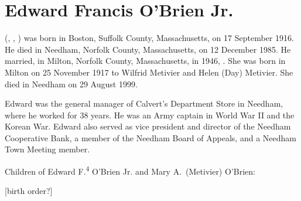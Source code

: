 \section{Edward Francis O'Brien Jr.}

 (, , ) was born in Boston, Suffolk County, Massachusetts, on 17 September 1916.\cite{Edward4OBrien2Birth} He died in Needham, Norfolk County, Massachusetts, on 12 December 1985.\cite{Edward4OBrien2Death,Edward2OBrien2Obit} He married, in Milton, Norfolk County, Massachusetts, in 1946, .\cite{Edward4OBrien2Marriage} She was born in Milton on 25 November 1917 to Wilfrid Metivier and Helen (Day) Metivier.\cite{MaryMetivierBirth} She died in Needham on 29 August 1999.\cite{MaryMetivierDeath}

Edward was the general manager of Calvert's Department Store in Needham, where he worked for 38 years. He was an Army captain in World War II and the Korean War. Edward also served as vice president and director of the Needham Cooperative Bank, a member of the Needham Board of Appeals, and a Needham Town Meeting member.\cite{Edward4OBrien2Obit}

\begin{KidsIntro}
	Children of Edward F.\textsuperscript{4} O'Brien Jr. and Mary A.\ (Metivier) O'Brien:
\end{KidsIntro}

\begin{Kids}
	
	
	
\end{Kids}

[birth order?]
